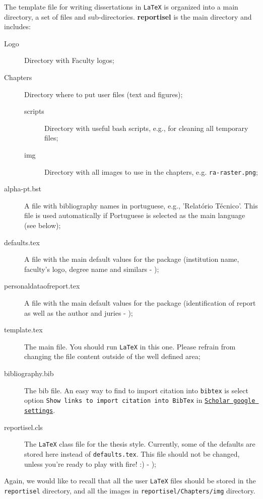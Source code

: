 The template file for writing dissertations in  \texttt{LaTeX} is organized into a main directory, a set of files and sub-directories. \textbf{reportisel}  is the main directory and includes:
	\begin{description}
		\item[Logo] Directory with Faculty logos;
		\item[Chapters] Directory where to put user files (text and figures);
		\begin{description}
		\item[scripts] Directory with useful bash scripts, e.g., for cleaning all temporary files;
		\item[img] Directory with all images to use in the chapters, e.g. \texttt{ra-raster.png};
		\end{description}
		\item[alpha-pt.bst] A file with bibliography names in portuguese, e.g., 'Relatório Técnico'. This file is used automatically if Portuguese is selected as the main language (see below);
		\item[defaults.tex] A file with the main default values for the package (institution name, faculty's logo, degree name and similars - {\color{red}{TO CHANGE BY THE USER}});
		\item[personaldataofreport.tex] A file with the main default values for the package (identification of report as well as the author and juries - {\color{red}{TO CHANGE BY THE USER}});
		\item[template.tex] The main file. You should run  \texttt{LaTeX} in this one. Please refrain from changing the file content outside of the well defined area;
		\item[bibliography.bib] The bib file. An easy way to find to import citation into \texttt{bibtex} is select option \texttt{Show links to import citation into \texttt{BibTex}} in \href{http://scholar.google.pt/scholar_settings?hl=en&as_sdt=0,5}{\texttt{Scholar google settings}}.
		\item[reportisel.cls] The  \texttt{LaTeX} class file for the thesis{} style. Currently, some of the defaults are stored here instead of \verb!defaults.tex!. This file should not be changed, unless you're ready to play with fire! :) - {\color{red}{DO NOT CHANGE}});
	\end{description}

Again, we would like to recall that all the user \texttt{LaTeX} files should be stored in the \verb!reportisel! directory, and all the images in \verb!reportisel/Chapters/img! directory.


